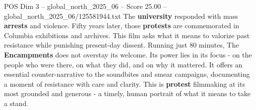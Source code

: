 \begin{textsample}{POS Dim 3 – global\_north\_2025\_06 – Score 25.00 – global\_north\_2025\_06/125581944.txt}
The \textbf{university} responded with mass \textbf{arrests} and violence.
Fifty years later, those \textbf{protests} are commemorated in Columbia exhibitions and archives.
This film asks what it means to valorize past resistance while punishing present-day dissent.
Running just 80 minutes, The \textbf{Encampments} does not overstay its welcome.
Its power lies in its focus - on the people who were there, on what they did, and on why it mattered.
It offers an essential counter-narrative to the soundbites and smear campaigns, documenting a moment of resistance with care and clarity.
This is \textbf{protest} filmmaking at its most grounded and generous - a timely, human portrait of what it means to take a stand.

\end{textsample}
